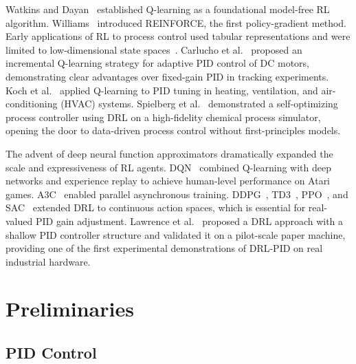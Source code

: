 \documentclass[conference,a4paper]{IEEEtran}[2015/08/26]
\begin{document}
Watkins and Dayan~\cite{Watkins1992} established Q-learning as a
foundational model-free RL algorithm. Williams~\cite{Williams1992}
introduced REINFORCE, the first policy-gradient method. Early
applications of RL to process control used tabular representations
and were limited to low-dimensional state spaces~\cite{Bellman1957}.
Carlucho et al.~\cite{Carlucho2017} proposed an incremental Q-learning
strategy for adaptive PID control of DC motors, demonstrating clear
advantages over fixed-gain PID in tracking experiments. Koch et
al.~\cite{Koch2019} applied Q-learning to PID tuning in heating,
ventilation, and air-conditioning (HVAC) systems. Spielberg et
al.~\cite{Spielberg2019} demonstrated a self-optimizing process
controller using DRL on a high-fidelity chemical process simulator,
opening the door to data-driven process control without first-principles
models.

The advent of deep neural function approximators dramatically expanded
the scale and expressiveness of RL agents. DQN~\cite{Mnih2015} combined
Q-learning with deep networks and experience replay to achieve
human-level performance on Atari games. A3C~\cite{Mnih2016} enabled
parallel asynchronous training. DDPG~\cite{Lillicrap2016}, TD3~\cite{Fujimoto2018},
PPO~\cite{Schulman2017}, and SAC~\cite{Haarnoja2018} extended DRL to
continuous action spaces, which is essential for real-valued PID gain
adjustment. Lawrence et al.~\cite{Lawrence2022} proposed a DRL approach
with a shallow PID controller structure and validated it on a
pilot-scale paper machine, providing one of the first experimental
demonstrations of DRL-PID on real industrial hardware.

\section{Preliminaries}
\label{sec:prelim}

\subsection{PID Control}
\end{document}

